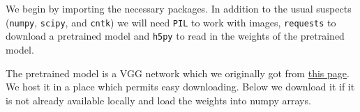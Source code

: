 \documentclass[]{book}
\newenvironment{Shaded}{\begin{snugshade}}{\end{snugshade}}
\newcommand{\KeywordTok}[1]{\textcolor[rgb]{0.13,0.29,0.53}{\textbf{#1}}}
\newcommand{\DecValTok}[1]{\textcolor[rgb]{0.00,0.00,0.81}{#1}}
\newcommand{\StringTok}[1]{\textcolor[rgb]{0.31,0.60,0.02}{#1}}
\newcommand{\ImportTok}[1]{#1}
\newcommand{\CommentTok}[1]{\textcolor[rgb]{0.56,0.35,0.01}{\textit{#1}}}
\newcommand{\ControlFlowTok}[1]{\textcolor[rgb]{0.13,0.29,0.53}{\textbf{#1}}}
\newcommand{\OperatorTok}[1]{\textcolor[rgb]{0.81,0.36,0.00}{\textbf{#1}}}
\newcommand{\NormalTok}[1]{#1}
\theoremstyle{definition}
\theoremstyle{definition}
\theoremstyle{definition}
\theoremstyle{remark}
\begin{document}
We begin by importing the necessary packages. In addition to the usual
suspects (\texttt{numpy}, \texttt{scipy}, and \texttt{cntk}) we will
need \texttt{PIL} to work with images, \texttt{requests} to download a
pretrained model and \texttt{h5py} to read in the weights of the
pretrained model.

\begin{Shaded}
\end{Shaded}

The pretrained model is a VGG network which we originally got from
\href{https://gist.github.com/baraldilorenzo/07d7802847aaad0a35d3}{this
page}. We host it in a place which permits easy downloading. Below we
download it if it is not already available locally and load the weights
into numpy arrays.
\end{document}
